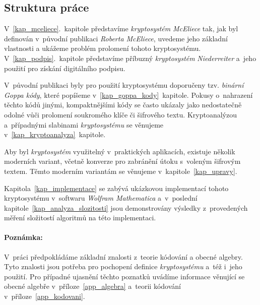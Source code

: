 \documentclass[thesis=M,czech,hidelinks]{FITthesis}[2012/06/26]
\newcommand{\0}{{\textcolor[gray]{0.75}{0}}}
\begin{document}
\begin{introduction}
\section*{Struktura práce}

V~\ref{kap_mceliece}.~kapitole představíme \emph{kryptosystém} \emph{McEliece}
tak, jak byl definován v~původní publikaci \emph{Roberta McEliece}, uvedeme jeho
základní vlastnosti a ukážeme problém prolomení tohoto kryptosystému.
V~\ref{kap_podpis}.~kapitole představíme příbuzný \emph{kryptosystém}
\emph{Niederreiter} a~jeho použití pro získání digitálního podpisu.

V~původní publikaci byly pro použití kryptosystému doporučeny tzv.
\emph{binární Goppa kódy}, které popíšeme v~\ref{kap_goppa_kody}~kapitole.
Pokusy o~nahrazení těchto kódů jinými, kompaktnějšími kódy se často ukázaly jako
nedostatečně odolné vůči prolomení soukromého klíče či šifrového textu.
Kryptoanalýzou a~případnými slabinami \emph{kryptosystému} se věnujeme
v~\ref{kap_kryptoanalyza}~kapitole.

Aby byl \emph{kryptosystém} využitelný v~praktických aplikacích, existuje
několik moderních variant, včetně konverze pro zabránění útoku s~voleným
šifrovým textem. Těmto moderním variantám se věnujeme
v~kapitole~\ref{kap_upravy}.

Kapitola~\ref{kap_implementace} se zabývá ukázkovou implementací tohoto
kryptosystému v~softwaru \emph{Wolfram Mathematica} a~v~poslední
kapitole~\ref{kap_analyza_slozitosti} jsou demonstrovány výsledky z~provedených
měření složitostí algoritmů na této implementaci.

\vfil

\paragraph{Poznámka:} V~práci předpokládáme základní znalosti z~teorie kódování
a obecné algebry. Tyto znalosti jsou potřeba pro pochopení definice
\emph{kryptosystému} a~též i~jeho použití. Pro případné ujasnění těchto poznatků
uvádíme informace věnující se obecné algebře v~příloze~\ref{app_algebra}
a~teorii kódování v~příloze~\ref{app_kodovani}.

\vfill

\end{introduction}





\end{document}
